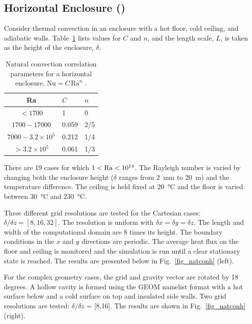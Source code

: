 \documentclass[11pt]{book}
\begin{document}
\FloatBarrier


\subsection{Horizontal Enclosure (\texorpdfstring{}{natconh})}
\label{sec:natconh}

Consider thermal convection in an enclosure with a hot floor, cold ceiling, and adiabatic walls. Table~\ref{tab:freeconh} lists values for $C$ and $n$, and the length scale, $L$, is taken as the height of the enclosure, $\delta$.
\begin{table}[h]
\centering
\caption[Natural convection correlation parameters for a horizontal enclosure]{Natural convection correlation parameters for a horizontal enclosure, $\mathrm{Nu}=C \, \mathrm{Ra}^n$ \cite{Holman:1}.}
\label{tab:freeconh}
\begin{tabular}{cll}
Ra                       & $C$    & $n$ \\
\hline
$<1700$                  & 1      & 0   \\
$1700 - 17000$           & 0.059  & 2/5 \\
$7000 - 3.2 \times 10^5$ & 0.212  & 1/4 \\
$>3.2 \times 10^5$       & 0.061  & 1/3
\end{tabular}
\end{table}
There are 19 cases for which $1 < {\rm Ra} < 10^{14}$.  The Rayleigh number is varied by changing both the enclosure height ($\delta$ ranges from 2~mm to 20~m) and the temperature difference.  The ceiling is held fixed at 20~\si{\degreeCelsius} and the floor is varied between 30~\si{\degreeCelsius} and 230~\si{\degreeCelsius}.

Three different grid resolutions are tested for the Cartesian cases: $\delta/\delta z = [8,16,32]$.  The resolution is uniform with $\delta x = \delta y = \delta z$.  The length and width of the computational domain are 8 times its height. The boundary conditions in the $x$ and $y$ directions are periodic. The average heat flux on the floor and ceiling is monitored and the simulation is run until a clear stationary state is reached.  The results are presented below in Fig.~\ref{fig_natconh} (left).

For the complex geometry cases, the grid and gravity vector are rotated by 18 degrees.  A hollow cavity is formed using the {\ct GEOM} namelist format with a hot surface below and a cold surface on top and insulated side walls.  Two grid resolutions are tested: $\delta/\delta z$ = [8,16].  The results are shown in Fig.~\ref{fig_natconh} (right).
\end{document}
